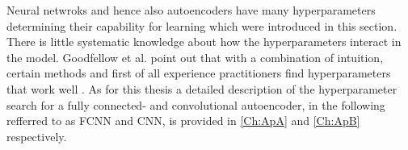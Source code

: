 Neural netwroks and hence also autoencoders have many hyperparameters determining their capability for learning which were introduced in this section. There is little systematic knowledge about how the hyperparameters interact in the model. Goodfellow et al. point out that with a combination of intuition, certain methods and first of all experience practitioners find hyperparameters that work well \cite{Goodfellow}. As for this thesis a detailed description of the hyperparameter search for a fully connected- and convolutional autoencoder, in the following refferred to as FCNN and CNN, is provided in \cref{Ch:ApA} and \cref{Ch:ApB} respectively.